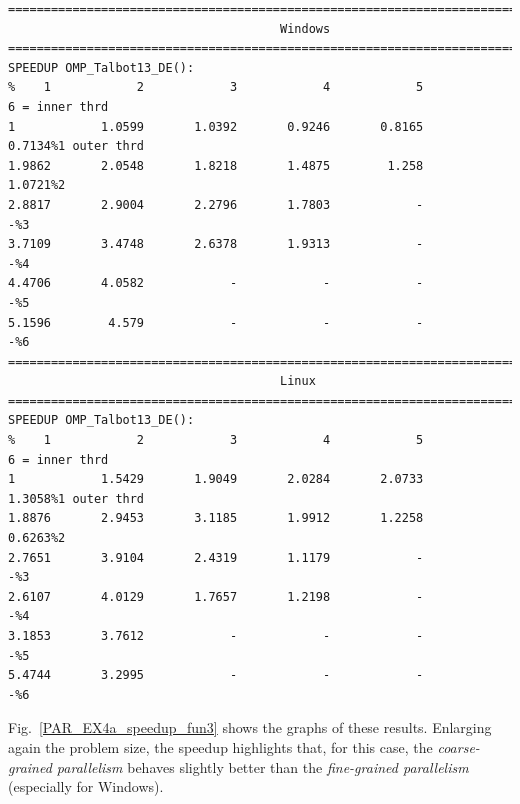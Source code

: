 \documentclass[a4paper,10pt]{report}%
\begin{document}
\begin{lstlisting}
====================================================================================
                                      Windows
====================================================================================
SPEEDUP OMP_Talbot13_DE():
%    1            2            3            4            5            6 = inner thrd
1            1.0599       1.0392       0.9246       0.8165       0.7134%1 outer thrd
1.9862       2.0548       1.8218       1.4875        1.258       1.0721%2
2.8817       2.9004       2.2796       1.7803            -            -%3
3.7109       3.4748       2.6378       1.9313            -            -%4
4.4706       4.0582            -            -            -            -%5
5.1596        4.579            -            -            -            -%6
====================================================================================
                                      Linux
====================================================================================
SPEEDUP OMP_Talbot13_DE():
%    1            2            3            4            5            6 = inner thrd
1            1.5429       1.9049       2.0284       2.0733       1.3058%1 outer thrd
1.8876       2.9453       3.1185       1.9912       1.2258       0.6263%2
2.7651       3.9104       2.4319       1.1179            -            -%3
2.6107       4.0129       1.7657       1.2198            -            -%4
3.1853       3.7612            -            -            -            -%5
5.4744       3.2995            -            -            -            -%6
\end{lstlisting}
Fig.~\ref{PAR_EX4a_speedup_fun3} shows the graphs of these results. Enlarging again the problem size,
the speedup highlights that, for this case, the {\em coarse-grained parallelism} behaves slightly better
than the {\em fine-grained parallelism} (especially for Windows).
\end{document}
